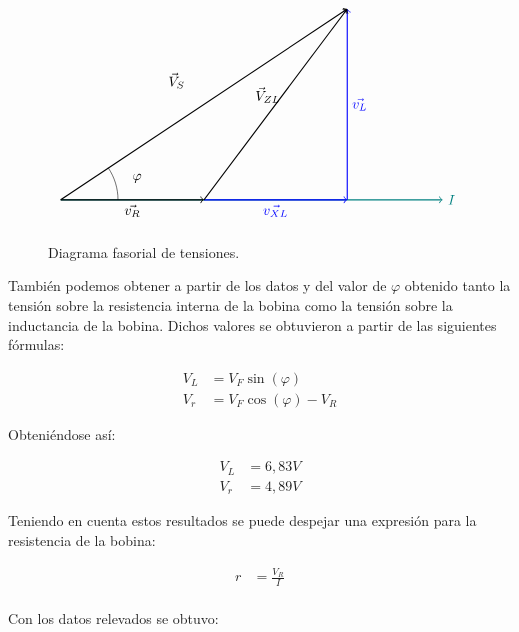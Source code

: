 \begin{figure}[h]
\centering
\[
\begin{tikzpicture}[scale=1.2]

\coordinate (O) at (0,0);
\coordinate (A) at (3,0);
\coordinate (B) at (6,0);
\coordinate (C) at (6,4);

\draw[->, thick, teal] (0,0) -- (8,0) node[right] {$I$};

\draw[->, thick] (O) -- (A);
\node[below] at (1.5,0) {$\vec{v_R}$};

\draw[->, thick, blue] (A) -- (B);
\node[below, blue] at (4.5,0) {$\vec{v_{XL}}$};

\draw[->, thick, blue] (B) -- (C);
\node[right, blue] at (6,2) {$\vec{v_L}$};

\draw[->, thick] (A) -- (C);
\node[left] at (4.7,2.2) {$\vec{V}_{ZL}$};

\draw[->, thick] (O) -- (C);
\node[left] at (2.7,2.5) {$\vec{V}_{S}$};

\draw (1.2,0) arc (0:34:1.2);
\node at (1.6,0.45) {$\varphi$};

\end{tikzpicture}
\]
\caption{Diagrama fasorial de tensiones.}
\end{figure}

También podemos obtener a partir de los datos y del valor de $\varphi$ obtenido tanto la tensión sobre la resistencia interna de la bobina como la tensión sobre la inductancia de la bobina. Dichos valores se obtuvieron a partir de las siguientes fórmulas:

\begin{align*}
  V_L &= V_F \sin(\varphi) \\
  V_r &= V_F \cos(\varphi) - V_R
\end{align*}

Obteniéndose así:

\begin{align*}
    V_L &=  6,83 V\\
    V_r &= 4,89V
\end{align*}

Teniendo en cuenta estos resultados se puede despejar una expresión para la resistencia de la bobina:

\begin{align*}
    r &=  \frac{V_R}{I}\\
\end{align*}

Con los datos relevados se obtuvo:

